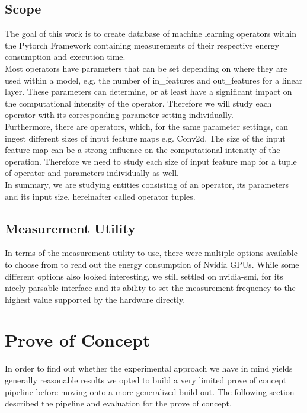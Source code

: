 \documentclass[conference]{IEEEtran}
\begin{document}
\subsection{Scope}
The goal of this work is to create database of machine learning operators within the Pytorch Framework containing measurements of their respective energy consumption and execution time. \\
Most operators have parameters that can be set depending on where they are used within a model, e.g. the number of in\_features and out\_features for a linear layer.
These parameters can determine, or at least have a significant impact on the computational intensity of the operator. Therefore we will study each operator with its corresponding parameter setting individually. \\
Furthermore, there are operators, which, for the same parameter settings, can ingest different sizes of input feature maps e.g. Conv2d. The size of the input feature map can be a strong influence on the computational intensity of the operation. Therefore we need to study each size of input feature map for a tuple of operator and parameters individually as well. \\
In summary, we are studying entities consisting of an operator, its parameters and its input size, hereinafter called operator tuples.  \\




\subsection{Measurement Utility}
In terms of the measurement utility to use, there were multiple options available to choose from to read out the energy consumption of Nvidia GPUs. While some different options also looked interesting, we still settled on nvidia-smi, for its nicely parsable interface and its ability to set the measurement frequency to the highest value supported by the hardware directly.


\section{Prove of Concept}

In order to find out whether the experimental approach we have in mind yields generally reasonable results we opted to build a very limited prove of concept pipeline before moving onto a more generalized build-out. The following section described the pipeline and evaluation for the prove of concept.
\end{document}
